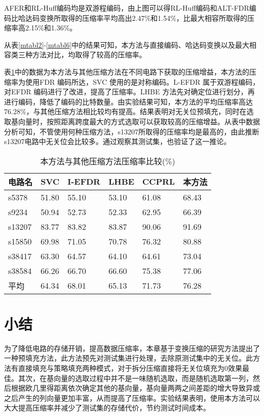 AFER和RL-Huff编码均是双游程编码，由上图可以得RL-Huff编码和ALT-FDR编码比哈达码变换所取得的压缩率平均高出2.47\%和1.54\%，比最大相容所取得的压缩率高2.15\%和1.36\%。

从表\ref{mtabl2}-\ref{mtabl6}中的结果可知，本方法与直接编码、哈达码变换以及最大相容类三种方法对比，均取得了较高的压缩率。

表\ref{mtabl7}中的数据为本方法与其他压缩方法在不同电路下获取的压缩增益，本方法的压缩率为使用FDR 编码所达，SVC 使用的是对称编码。L-EFDR 属于双游程编码，对EFDR 编码进行了改进，提高了压缩率。LHBE 方法先对确定位进行划分，再进行编码，降低了编码的比特数量。由实验结果可知，本方法的平均压缩率高达76.28\%，与其他压缩方法相比较均有提高。结果表明对无关位预填充，同时在选取基向量时，按照距离跨度最大的方式选取可以获取较高的压缩增益。从表中数据分析可知，不管使用何种压缩方法，s13207所取得的压缩率均是最高的，由此推断s13207电路中无关位会比较多。通过观察其测试集，也验证了这一推论。

\begin{table}[H]
\centering
\caption{本方法与其他压缩方法压缩率比较(\%)}\label{mtabl7}
\begin{tabular}{p{1.6cm}p{2.36cm}<{\centering}p{2.36cm}<{\centering}p{2.36cm}<{\centering}p{2.36cm}<{\centering}
p{2.36cm}<{\centering}}
\toprule
\textbf{电路名}&	\textbf{SVC\cite{72}	}& \textbf{I-EFDR\cite{73}}& \textbf{LHBE\cite{74}}& \textbf{CCPRL\cite{75}}& \textbf{本方法}\\
\midrule
s5378&	51.80&	55.10&	53.10&	61.08&	68.43\\
s9234& 	50.94& 	52.73& 	52.33& 	62.95&	66.39\\
s13207& 83.77& 	83.82& 	83.87& 	90.06& 	91.69\\
s15850& 69.98& 	71.05& 	70.78& 	76.32& 	80.88\\
s38417& 63.30& 	64.57& 	64.10& 	64.61& 	73.04\\
s38584& 66.26& 	66.70& 	66.60&	75.38& 	77.06\\
平均& 	64.34& 	68.01& 	65.13& 	71.73& 	76.28\\
\bottomrule
\end{tabular}
\end{table}

\section{小结}

为了降低电路的存储开销，提高数据压缩率，本章基于变换压缩的研究方法提出了一种预填充方法，此方法预先对测试集进行处理，去除原测试集中的无关位。此方法有直接填充与策略填充两种模式，对于拆分压缩直接将无关位填充为0效果最佳。其次，在基向量的选取过程中并不是一味随机选取，而是随机选取第一列，然后根据欧几里得距离依次确定其他的基向量，基向量两两之间差距的增大导致异或之后产生的列向量更加丰富，从而提高了压缩率。实验结果表明，使用本方法可以大大提高压缩率并减少了测试集的存储代价，节约测试时间成本。
